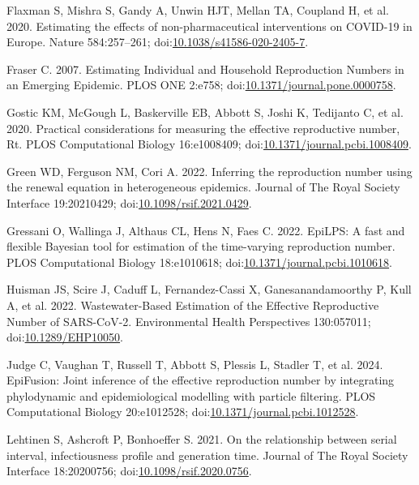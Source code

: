 \documentclass[
  letterpaper,
  DIV=11,
  numbers=noendperiod]{scrreprt}
\newlength{\cslhangindent}
\newenvironment{CSLReferences}[2] %
 {\begin{list}{}{%
  \setlength{\itemindent}{0pt}
  \setlength{\leftmargin}{0pt}
  \setlength{\parsep}{0pt}
  \ifodd #1
   \setlength{\leftmargin}{\cslhangindent}
   \setlength{\itemindent}{-1\cslhangindent}
  \fi
  \setlength{\itemsep}{#2\baselineskip}}}
 {\end{list}}
\begin{document}
\begin{CSLReferences}{1}{1}
Flaxman S, Mishra S, Gandy A, Unwin HJT, Mellan TA, Coupland H, et al.
2020. Estimating the effects of non-pharmaceutical interventions on
{COVID}-19 in {Europe}. Nature 584:257--261;
doi:\href{https://doi.org/10.1038/s41586-020-2405-7}{10.1038/s41586-020-2405-7}.

Fraser C. 2007. Estimating {Individual} and {Household} {Reproduction}
{Numbers} in an {Emerging} {Epidemic}. PLOS ONE 2:e758;
doi:\href{https://doi.org/10.1371/journal.pone.0000758}{10.1371/journal.pone.0000758}.

Gostic KM, McGough L, Baskerville EB, Abbott S, Joshi K, Tedijanto C, et
al. 2020. Practical considerations for measuring the effective
reproductive number, {Rt}. PLOS Computational Biology 16:e1008409;
doi:\href{https://doi.org/10.1371/journal.pcbi.1008409}{10.1371/journal.pcbi.1008409}.

Green WD, Ferguson NM, Cori A. 2022. Inferring the reproduction number
using the renewal equation in heterogeneous epidemics. Journal of The
Royal Society Interface 19:20210429;
doi:\href{https://doi.org/10.1098/rsif.2021.0429}{10.1098/rsif.2021.0429}.

Gressani O, Wallinga J, Althaus CL, Hens N, Faes C. 2022. EpiLPS: A fast
and flexible {Bayesian} tool for estimation of the time-varying
reproduction number. PLOS Computational Biology 18:e1010618;
doi:\href{https://doi.org/10.1371/journal.pcbi.1010618}{10.1371/journal.pcbi.1010618}.

Huisman JS, Scire J, Caduff L, Fernandez-Cassi X, Ganesanandamoorthy P,
Kull A, et al. 2022. Wastewater-{Based} {Estimation} of the {Effective}
{Reproductive} {Number} of {SARS}-{CoV}-2. Environmental Health
Perspectives 130:057011;
doi:\href{https://doi.org/10.1289/EHP10050}{10.1289/EHP10050}.

Judge C, Vaughan T, Russell T, Abbott S, Plessis L, Stadler T, et al.
2024. EpiFusion: Joint inference of the effective reproduction number by
integrating phylodynamic and epidemiological modelling with particle
filtering. PLOS Computational Biology 20:e1012528;
doi:\href{https://doi.org/10.1371/journal.pcbi.1012528}{10.1371/journal.pcbi.1012528}.

Lehtinen S, Ashcroft P, Bonhoeffer S. 2021. On the relationship between
serial interval, infectiousness profile and generation time. Journal of
The Royal Society Interface 18:20200756;
doi:\href{https://doi.org/10.1098/rsif.2020.0756}{10.1098/rsif.2020.0756}.


\end{CSLReferences}
\end{document}
